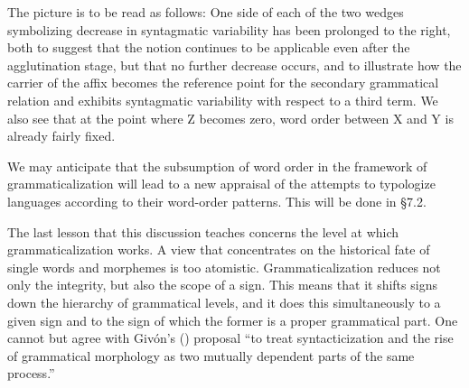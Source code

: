 \enlargethispage{1\baselineskip}
The picture is to be read as follows: One side of each of the two wedges symbolizing decrease in syntagmatic variability has been prolonged to the right, both to suggest that the notion continues to be applicable even after the agglutination stage, but that no further decrease occurs, and to illustrate how the carrier of the affix becomes the reference point for the secondary grammatical relation and exhibits syntagmatic variability with respect to a third term. We also see that at the point where Z becomes zero, word order between X and Y is already fairly fixed.

We may anticipate that the subsumption of word order in the framework of grammaticalization will lead to a new appraisal of the attempts to typologize languages according to their word-order patterns. This will be done in §7.2.

The last lesson that this discussion teaches concerns the level at which grammaticalization works. A view that concentrates on the historical fate of single words and morphemes is too atomistic. Grammaticalization reduces not only the integrity, but also the scope of a sign. This means that it shifts signs down the hierarchy of grammatical levels, and it does this simultaneously to a given sign and to the sign of which the former is a proper grammatical part. One cannot but agree with Givón's (\citeyear[94]{Givón1979}) proposal “to treat syntacticization and the rise of grammatical morphology as two mutually dependent parts of the same process.”

